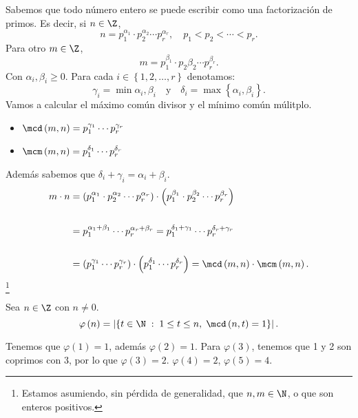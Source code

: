 Sabemos que todo número entero se puede escribir como una factorización de primos. Es decir, si $\displaystyle n \in \Z $, 
\[n = p_{1}^{\alpha_{1}} \cdot p_{2}^{\alpha_{2}} \cdots p_{r}^{\alpha_{r}}, \quad p _{1}< p_{2} < \cdots<p_{r} .\]
Para otro $\displaystyle m\in\Z $,
\[m = p_{1}^{\beta_{1}} \cdot p_{2}\beta_{2} \cdots p_{r}^{\beta_{r}}.\]
Con $\displaystyle \alpha_{i}, \beta_{i} \geq 0 $. Para cada $\displaystyle i \in \left\{ 1, 2, \ldots, r\right\}  $ denotamos:
\[ \gamma_{i} = \min{\alpha_{i}, \beta_{i}} \quad \text{y} \quad \delta_{i} = \max \left\{ \alpha_{i}, \beta_{i}\right\}  .\]
Vamos a calcular el máximo común divisor y el mínimo común múlitplo. 
\begin{itemize}
\item $\displaystyle \mcd\left(m,n\right) = p_{1}^{\gamma_{1}} \cdots p_{r}^{\gamma_{r}} $
\item $\displaystyle \mcm\left(m,n\right) = p^{\delta_{1}}_{1} \cdots p _{r}^{\delta_{r}} $ 
\end{itemize}
 Además sabemos que $\displaystyle \delta_{i} + \gamma _{i} = \alpha_{i}+\beta_{i} $. 
 \[
	 \begin{split}
		 m \cdot n & = \left(p_{1}^{\alpha_{1}} \cdot p_{2}^{\alpha_{2}} \cdots p_{r}^{\alpha_{r}}\right) \cdot \left(p_{1}^{\beta_{1}} \cdot p_{2}^{\beta_{2}} \cdots p_{r}^{\beta_{r}}\right) 
		     \\ \\ & = p_{1}^{\alpha_{1}+\beta_{1}} \cdots p_{r}^{\alpha_{r}+\beta_{r}} = p_{1}^{\delta_{1}+\gamma_{1}} \cdots p_{r}^{\delta_{r}+\gamma_{r}} \\ \\ &= \left(p_{1}^{\gamma_{1}} \cdots p_{r}^{\gamma_{r}}\right) \cdot \left(p_{1}^{\delta_{1}} \cdots p_{r}^{\delta_{r}}\right) =\mcd\left(m,n\right) \cdot \mcm\left(m,n\right) .
	 \end{split}\] \footnote{Estamos asumiendo, sin pérdida de generalidad, que $\displaystyle n,m \in \N $, o que son enteros positivos.} 
\begin{fdefinition}
\normalfont Sea $\displaystyle n \in \Z $  con $\displaystyle n \neq 0 $. 
\[\varphi \left(n\right) = \left| \left\{ t \in \N \; : \; 1 \leq t \leq n, \; \mcd\left(n,t\right) = 1\right\} \right| .\]
\end{fdefinition}

\begin{eg}
\normalfont Tenemos que $\displaystyle \varphi\left(1\right) = 1 $, además $\displaystyle \varphi\left(2\right) = 1 $. Para $\displaystyle \varphi\left(3\right) $, tenemos que 1 y 2 son coprimos con 3, por lo que $\displaystyle \varphi\left(3\right) = 2 $. $\displaystyle \varphi\left(4\right) = 2 $, $\displaystyle \varphi\left(5\right) = 4 $. 
\end{eg}

